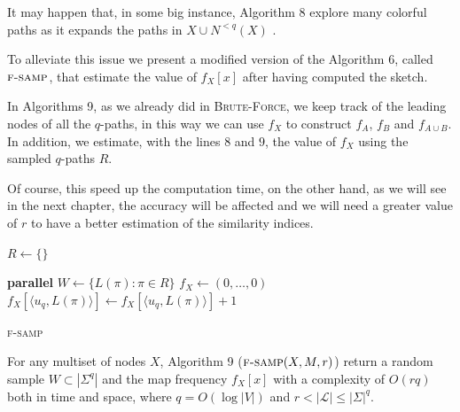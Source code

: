 \clearpage

It may happen that, in some big instance, Algorithm 8 explore many colorful paths as it expands the paths in $X \cup N^{<q}(X)$ .

To alleviate this issue we present a modified version of the Algorithm 6, called $\textsc{f-samp}$, that estimate the value of $f_{X}[x]$ after having computed the sketch.\medskip

In Algorithms 9, as we already did in \textsc{Brute-Force}, we keep track of the leading nodes of all the $q$-paths, in this way we can use $f_{X}$ to construct $f_A$, $f_B$ and $f_{A \cup B}$. In addition, we estimate, with the lines $8$ and $9$, the value of $f_X$ using the sampled $q$-paths $R$.\medskip

Of course, this speed up the computation time, on the other hand, as we will see in the next chapter, the accuracy will be affected and we will need a greater value of $r$ to have a better estimation of the similarity indices.

\begin{algorithm}[h]
	\small
	\DontPrintSemicolon
	$R \gets \{\}$\;
		
	\BlankLine
	\textbf{parallel} 
	\BlankLine
	$W \gets \{ L(\pi) : \pi \in R \}$\;
	\BlankLine
	$f_X \gets (0,\ldots,0)$\;
	{
		$f_X[\langle u_{q}, L(\pi) \rangle ] \gets f_X[\langle u_{q}, L(\pi) \rangle]+1$
	}
	\BlankLine
	\caption{\textsc{f-samp}}
	\label{alg:f-samp}
\end{algorithm}

\begin{lemma}
	For any multiset of nodes $X$, 
	Algorithm 9 ($\textsc{f-samp}(X, M, r)$) return a random sample $W \subset |\Sigma^{q}|$ and the map frequency $f_{X}[x]$
	with a complexity of $O(rq)$ both in time and space, 
	where $q = O(\log |V|)$ and $r < |\mathcal{L}| \leq |\Sigma|^{q}$.
\end{lemma}

